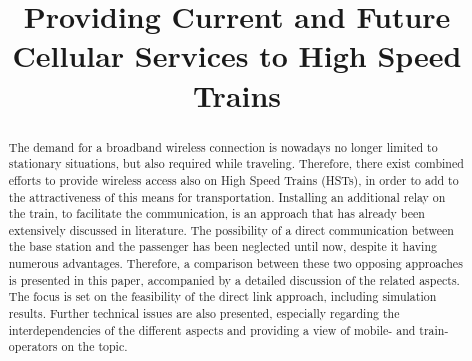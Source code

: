 \documentclass[a4paper,conference,twocolumn,10pt]{IEEEtran}
\begin{document}
\begin{acronym}
\end{acronym}  
\title{Providing Current and Future Cellular Services to High Speed Trains}
\author{
    \IEEEauthorblockN{Martin Klaus M\"uller, Martin Taranetz and Markus Rupp\2mm]}
}

\maketitle




\newpage

\begin{abstract}
The demand for a broadband wireless connection is nowadays no longer limited to stationary situations, but also required while traveling. Therefore, there exist combined efforts to provide wireless access also on High Speed Trains (HSTs), in order to add to the attractiveness of this means for transportation. Installing an additional relay on the train, to facilitate the communication, is an approach that has already been extensively discussed in literature. The possibility of a direct communication between the base station and the passenger has been neglected until now, despite it having numerous advantages. Therefore, a comparison between these two opposing approaches is presented in this paper, accompanied by a detailed discussion of the related aspects. The focus is set on the feasibility of the direct link approach, including simulation results. Further technical issues are also presented, especially regarding the interdependencies of the different aspects and providing a view of mobile- and train-operators on the topic.
\end{abstract}
\end{document}
